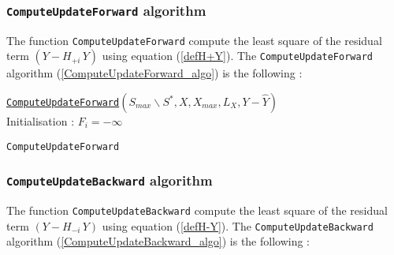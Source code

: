 \newpage
\subsubsection{\texttt{ComputeUpdateForward} algorithm}

 The function \texttt{ComputeUpdateForward} compute the least square of the residual term $(Y-H_{+i}\,Y)$ using equation (\ref{defH+Y}). 
 The \texttt{ComputeUpdateForward} algorithm (\ref{ComputeUpdateForward_algo}) is the following : 

\begin{algorithm}
\label{ComputeUpdateForward_algo}
\underline{\texttt{ComputeUpdateForward}}$(S_{max} \backslash S^*,X,X_{max},L_X,Y-\hat{Y})$\\
\BlankLine
Initialisation : $F_i = -\infty$
\BlankLine
{}
\caption{\texttt{ComputeUpdateForward} }
\end{algorithm}

\subsubsection{\texttt{ComputeUpdateBackward} algorithm}

The function \texttt{ComputeUpdateBackward} compute the least square of the residual term  $(Y-H_{-i}\,Y)$ using equation (\ref{defH-Y}). 
 The \texttt{ComputeUpdateBackward} algorithm (\ref{ComputeUpdateBackward_algo}) is the following :


